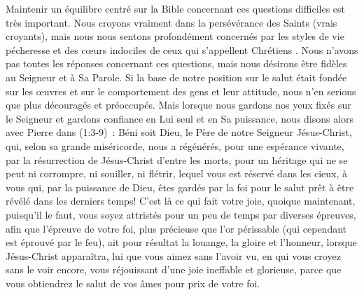 \begin{enumerate}
\begin{specialpar}{}
Maintenir un équilibre centré sur la Bible concernant ces questions difficiles est très important.
 Nous croyons vraiment dans la persévérance des Saints (vrais croyants),
 mais nous nous sentons profondément concernés par les styles de vie pécheresse et des cœurs indociles
 de ceux qui s'appellent \og Chrétiens \fg{}.
 Nous n'avons pas toutes les réponses concernant ces questions,
 mais nous désirons être fidèles au Seigneur et à Sa Parole.
 Si la base de notre position sur le salut était fondée sur les œuvres
 et sur le comportement des gens et leur attitude,
 nous n'en serions que plus découragés et préoccupés.
 Mais lorsque nous gardons nos yeux fixés sur le Seigneur et gardons confiance en Lui seul
 et en Sa puissance, nous disons alors avec Pierre dans
 \BRallowhypbch{}(1:3-9)\BRforbidhypbch~:
 \og Béni soit Dieu, le Père de notre Seigneur Jésus-Christ, qui, selon sa grande miséricorde,
 nous a régénérés, pour une espérance vivante, par la résurrection de Jésus-Christ d'entre les morts,
 pour un héritage qui ne se peut ni corrompre, ni souiller, ni flétrir,
 lequel vous est réservé dans les cieux, à vous qui, par la puissance de Dieu,
 êtes gardés par la foi pour le salut prêt à être révélé dans les derniers temps!
 C'est là ce qui fait votre joie, quoique maintenant, puisqu'il le faut,
 vous soyez attristés pour un peu de temps par diverses épreuves, afin que l'épreuve de votre foi,
 plus précieuse que l'or périssable (qui cependant est éprouvé par le feu),
 ait pour résultat la louange, la gloire et l'honneur, lorsque Jésus-Christ apparaîtra,
 lui que vous aimez sans l'avoir vu, en qui vous croyez sans le voir encore,
 vous réjouissant d'une joie ineffable et glorieuse,
 parce que vous obtiendrez le salut de vos âmes pour prix de votre foi. \fg{}
\end{specialpar}


\end{enumerate}

